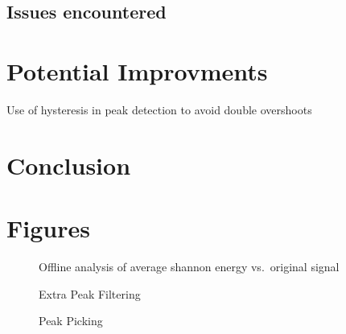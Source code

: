 \documentclass[titlepage]{scrartcl}
\begin{document}
\subsection{Issues encountered}
\section{Potential Improvments}
Use of hysteresis in peak detection to avoid double overshoots
\section{Conclusion}

\section{Figures}
\begin{figure}[H]
    \caption{Offline analysis of average shannon energy vs.\ original signal}
    \label{OfflineShanEngy}
\end{figure}
\begin{figure}[H]
    \caption{Extra Peak Filtering}
    \label{OfflinePeakFilter}
\end{figure}
\begin{figure}[H]
    \caption{Peak Picking}
    \label{OfflinePeakPick}
\end{figure}
\end{document}
